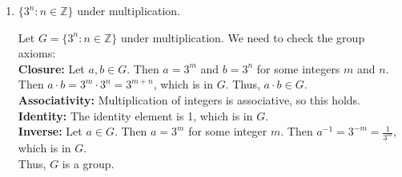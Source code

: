 \documentclass[10pt,twoside]{article}
\newcommand\Z{\mathbb{Z}}
\begin{document}
\begin{itemize}
\begin{enumerate}
\begin{enumerate}
\begin{solution}
            \end{solution}
			\item $\{ 3^n : n \in \Z \}$ under multiplication.
			\begin{solution}
                Let $G = \{ 3^n : n \in \Z \}$ under multiplication. We need to check the group axioms: \\ 
                \textbf{Closure:} Let $a, b \in G$. Then $a = 3^m$ and $b = 3^n$ for some integers $m$ and $n$. Then $a \cdot b = 3^m \cdot 3^n = 3^{m + n}$, which is in $G$. Thus, $a \cdot b \in G$. \\
                \textbf{Associativity:} Multiplication of integers is associative, so this holds. \\
                \textbf{Identity:} The identity element is 1, which is in $G$. \\
                \textbf{Inverse:} Let $a \in G$. Then $a = 3^m$ for some integer $m$. Then $a^{-1} = 3^{-m} = \frac{1}{3^m}$, which is in $G$. \\
                Thus, $G$ is a group.


\end{solution}
\end{enumerate}
\end{enumerate}
\end{itemize}
\end{document}
